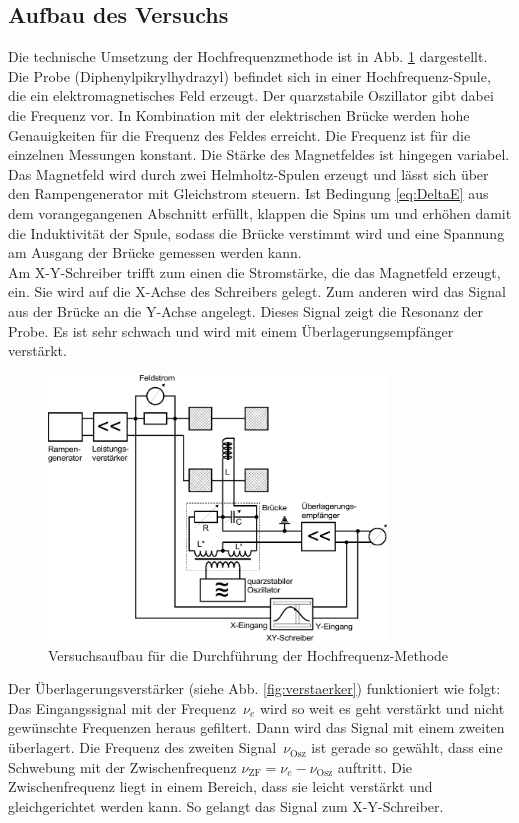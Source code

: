 \subsection{Aufbau des Versuchs}
Die technische Umsetzung der Hochfrequenzmethode ist in Abb. \ref{fig:aufbau} dargestellt. Die Probe (Diphenylpikrylhydrazyl) befindet sich in einer Hochfrequenz-Spule, die ein elektromagnetisches Feld erzeugt. Der quarzstabile Oszillator gibt dabei die Frequenz vor. In Kombination mit der elektrischen Brücke werden hohe Genauigkeiten für die Frequenz des Feldes erreicht. Die Frequenz ist für die einzelnen Messungen konstant. Die Stärke des Magnetfeldes ist hingegen variabel. Das Magnetfeld wird durch zwei Helmholtz-Spulen erzeugt und lässt sich über den Rampengenerator mit Gleichstrom steuern. Ist Bedingung \eqref{eq:DeltaE} aus dem vorangegangenen Abschnitt erfüllt, klappen die Spins um und erhöhen damit die Induktivität der Spule, sodass die Brücke verstimmt wird und eine Spannung am Ausgang der Brücke gemessen werden kann. \\
Am X-Y-Schreiber trifft zum einen die Stromstärke, die das Magnetfeld erzeugt, ein. Sie wird auf die X-Achse des Schreibers gelegt. Zum anderen wird das Signal aus der Brücke an die Y-Achse angelegt. Dieses Signal zeigt die Resonanz der Probe. Es ist sehr schwach und wird mit einem Überlagerungsempfänger verstärkt.

 \begin{figure}[h!]
	\centering
	\includegraphics[width=0.8\textwidth]{Anleitung_Abb8.pdf}
	\caption[Versuchsaufbau]{Versuchsaufbau für die Durchführung der Hochfrequenz-Methode \cite{V28}}
	\label{fig:aufbau}
\end{figure}
\clearpage
Der Überlagerungsverstärker (siehe Abb. \ref{fig:verstaerker}) funktioniert wie folgt: Das Eingangssignal mit der Frequenz~$\nu_e$ wird so weit es geht verstärkt und nicht gewünschte Frequenzen  heraus gefiltert. Dann wird das Signal mit einem zweiten überlagert. Die Frequenz des zweiten Signal~$\nu_\textrm{Osz}$ ist gerade so gewählt, dass eine Schwebung mit der Zwischenfrequenz $\nu_\textrm{ZF} = \nu_e - \nu_\textrm{Osz}$ auftritt. Die Zwischenfrequenz liegt in einem Bereich, dass sie leicht verstärkt und gleichgerichtet werden kann. So gelangt das Signal zum X-Y-Schreiber.


